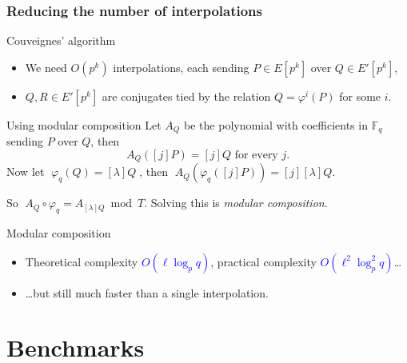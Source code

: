 \documentclass[10pt]{beamer}
\newcommand{\blue}[1]{\textcolor{blue}{#1}}  %
\newcommand{\F}{\mathbb{F}}  %
\newcommand{\frob}{\varphi}  %
\newcommand{\0}{\mathcal{O}}  %
\begin{document}

\begin{frame}
  \frametitle{Reducing the number of interpolations}

  \begin{block}{Couveignes' algorithm}
    \begin{itemize}
    \item We need $O(p^k)$ interpolations, each sending $P\in E[p^k]$
      over $Q\in E'[p^k]$,
    \item $Q,R\in E'[p^k]$ are conjugates tied by the relation
      $Q=\frob^i(P)$ for some $i$.
    \end{itemize}
  \end{block}

  \begin{block}{Using modular composition}
    Let $A_Q$ be the polynomial with coefficients in $\F_q$ sending
    $P$ over $Q$, then
    \[A_Q([j]P) = [j]Q \text{ for every $j$.}\]
    Now let $\;\frob_q(Q) = [\lambda]Q\;$, then $\;A_Q(\frob_q([j]P)) =
    [j][\lambda]Q$.

    So \alert{$\;A_Q\circ\frob_q = A_{[\lambda]Q} \bmod T$}. Solving this
    is \emph{modular composition}.
  \end{block}

  \begin{block}{Modular composition}
    \begin{itemize}
    \item Theoretical complexity \blue{$O(\ell\log_pq)$}, practical
      complexity \blue{$O(\ell^2\log_p^2q)$}\dots
    \item \dots but still much faster than a single interpolation.
    \end{itemize}
  \end{block}
\end{frame}


\section{Benchmarks}
\end{document}
